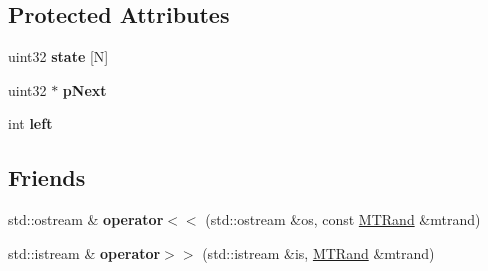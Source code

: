 \subsection*{Protected Attributes}
\begin{DoxyCompactItemize}
\item 
\hypertarget{classelpm_1_1_m_t_rand_a646bf8dff4694bdfb331dc913e3241bb}{uint32 {\bfseries state} \mbox{[}N\mbox{]}}\label{classelpm_1_1_m_t_rand_a646bf8dff4694bdfb331dc913e3241bb}

\item 
\hypertarget{classelpm_1_1_m_t_rand_adc53213ffcd82b388322f482f231bee8}{uint32 $\ast$ {\bfseries p\+Next}}\label{classelpm_1_1_m_t_rand_adc53213ffcd82b388322f482f231bee8}

\item 
\hypertarget{classelpm_1_1_m_t_rand_a27fed8b8169f6c08805e99e3f257e27c}{int {\bfseries left}}\label{classelpm_1_1_m_t_rand_a27fed8b8169f6c08805e99e3f257e27c}

\end{DoxyCompactItemize}
\subsection*{Friends}
\begin{DoxyCompactItemize}
\item 
\hypertarget{classelpm_1_1_m_t_rand_a059061d50a1e54ee3067d4e1dbdd7c64}{std\+::ostream \& {\bfseries operator$<$$<$} (std\+::ostream \&os, const \hyperlink{classelpm_1_1_m_t_rand}{M\+T\+Rand} \&mtrand)}\label{classelpm_1_1_m_t_rand_a059061d50a1e54ee3067d4e1dbdd7c64}

\item 
\hypertarget{classelpm_1_1_m_t_rand_a45b02a702835a3be42171c5c2dc79b2d}{std\+::istream \& {\bfseries operator$>$$>$} (std\+::istream \&is, \hyperlink{classelpm_1_1_m_t_rand}{M\+T\+Rand} \&mtrand)}\label{classelpm_1_1_m_t_rand_a45b02a702835a3be42171c5c2dc79b2d}

\end{DoxyCompactItemize}
